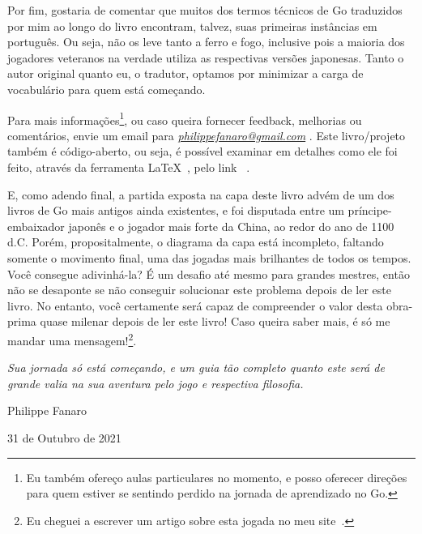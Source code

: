 \pagebreak

Por fim, gostaria de comentar que muitos dos termos técnicos de Go traduzidos por mim ao longo do livro encontram, talvez, suas primeiras instâncias em português. Ou seja, não os leve tanto a ferro e fogo, inclusive pois a maioria dos jogadores veteranos na verdade utiliza as respectivas versões japonesas. Tanto o autor original quanto eu, o tradutor, optamos por minimizar a carga de vocabulário para quem está começando.

\bigskip
\bigskip

Para mais informações\footnote{Eu também ofereço aulas particulares no momento, e posso oferecer direções para quem estiver se sentindo perdido na jornada de aprendizado no Go.}, ou caso queira fornecer feedback, melhorias ou comentários, envie um email para \emph{\href{mailto:philippefanaro@gmail.com}{philippefanaro@gmail.com}} \cite{fanaro_email}. Este livro/projeto também é código-aberto, ou seja, é possível examinar em detalhes como ele foi feito, através da ferramenta \LaTeX~\cite{latex}, pelo link \href{https://github.com/FanaroEngineering/traducao_como_jogar_go}{}~\cite{repo_github}.

E, como adendo final, a partida exposta na capa deste livro advém de um dos livros de Go mais antigos ainda existentes, e foi disputada entre um príncipe-embaixador japonês e o jogador mais forte da China, ao redor do ano de 1100 d.C. Porém, propositalmente, o diagrama da capa está incompleto, faltando somente o movimento final, uma das jogadas mais brilhantes de todos os tempos. Você consegue adivinhá-la? É um desafio até mesmo para grandes mestres, então não se desaponte se não conseguir solucionar este problema depois de ler este livro. No entanto, você certamente será capaz de compreender o valor desta obra-prima quase milenar depois de ler este livro! Caso queira saber mais, é só me mandar uma mensagem!\footnote{Eu cheguei a escrever um artigo sobre esta jogada no meu site~\cite{tesuji_mor}.}.

\bigskip
\bigskip

\emph{Sua jornada só está começando, e um guia tão completo quanto este será de grande valia na sua aventura pelo jogo e respectiva filosofia.}

\bigskip
\bigskip

Philippe Fanaro

31 de Outubro de 2021